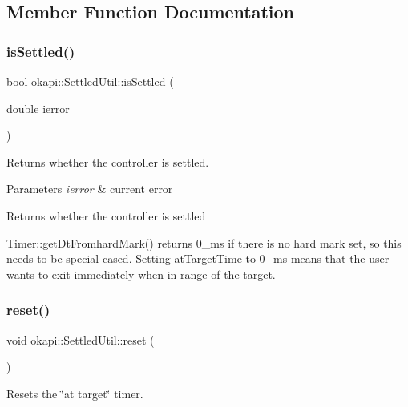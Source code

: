 \subsection{Member Function Documentation}
\mbox{\label{classokapi_1_1SettledUtil_aa651d2e0197b73f568993b4cf2520ca5}} 
\subsubsection{\texorpdfstring{isSettled()}{isSettled()}}
{\footnotesize\ttfamily bool okapi\+::\+Settled\+Util\+::is\+Settled (\begin{DoxyParamCaption}\item[{double}]{ierror }\end{DoxyParamCaption})\hspace{0.3cm}{\ttfamily [virtual]}}

Returns whether the controller is settled.


\begin{DoxyParams}{Parameters}
{\em ierror} & current error \\
\hline
\end{DoxyParams}
\begin{DoxyReturn}{Returns}
whether the controller is settled 
\end{DoxyReturn}
Timer\+::get\+Dt\+Fromhard\+Mark() returns 0\+\_\+ms if there is no hard mark set, so this needs to be special-\/cased. Setting at\+Target\+Time to 0\+\_\+ms means that the user wants to exit immediately when in range of the target.\mbox{\label{classokapi_1_1SettledUtil_a5341b7db25eaff4acafbe59b1b385ada}} 
\subsubsection{\texorpdfstring{reset()}{reset()}}
{\footnotesize\ttfamily void okapi\+::\+Settled\+Util\+::reset (\begin{DoxyParamCaption}{ }\end{DoxyParamCaption})\hspace{0.3cm}{\ttfamily [virtual]}}

Resets the \char`\"{}at target\char`\"{} timer. 

